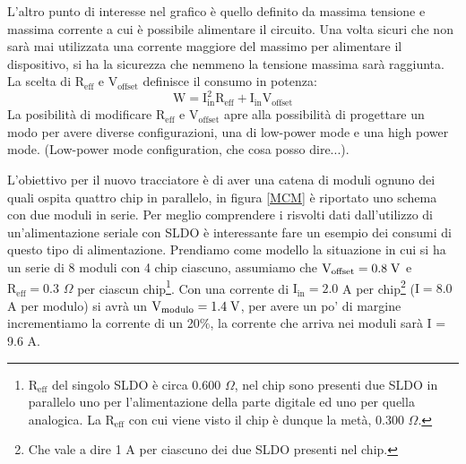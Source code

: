 L'altro punto di interesse nel grafico è quello definito da massima tensione e massima corrente a cui è possibile alimentare il circuito. 
Una volta sicuri che non sarà mai utilizzata una corrente maggiore del massimo per alimentare il dispositivo, si ha la sicurezza che nemmeno la tensione massima sarà raggiunta. La scelta di $\mathrm{R_{eff}}$ e $\mathrm{V_{offset}}$ definisce il consumo in potenza:
\begin{equation}
\mathrm{W=I_{in}^2R_{eff}+I_{in}V_{offset}}
\end{equation}
La posibilità di modificare $\mathrm{R_{eff}}$ e $\mathrm{V_{offset}}$ apre alla possibilità di progettare un modo per avere diverse configurazioni, una di low-power mode e una high power mode. %
(Low-power mode configuration, che cosa posso dire...).

L'obiettivo per il nuovo tracciatore è di aver una catena di moduli ognuno dei quali ospita quattro chip in parallelo, in figura \ref{MCM} è riportato uno schema con due moduli in serie. 
Per meglio comprendere i risvolti dati dall'utilizzo di un'alimentazione seriale con SLDO è interessante fare un esempio dei consumi di questo tipo di alimentazione. 
Prendiamo come modello la situazione in cui si ha un serie di 8 moduli con 4 chip ciascuno, assumiamo che $\mathrm{V_{offset}=0.8} \rm \; V$ e $\mathrm{R_{eff}=0.3}$ $\Omega$ per ciascun chip\footnote{$\mathrm{R_{eff}}$ del singolo SLDO è circa 0.600 $\Omega$, nel chip sono presenti due SLDO in parallelo uno per l'alimentazione della parte digitale ed uno per quella analogica. La $\mathrm{R_{eff}}$ con cui viene visto il chip è dunque la metà, 0.300 $\Omega$.}. 
Con una corrente di $\mathrm{I_{in}=2.0}$ A per chip\footnote{Che vale a dire 1 A per ciascuno dei due SLDO presenti nel chip.} ($\mathrm{I=8.0}$ A per modulo) si avrà un $\mathrm{V_{modulo}=1.4} \rm \; V$, per avere un po' di margine incrementiamo la corrente di un 20$\%$, la corrente che arriva nei moduli sarà I = 9.6 A. 

